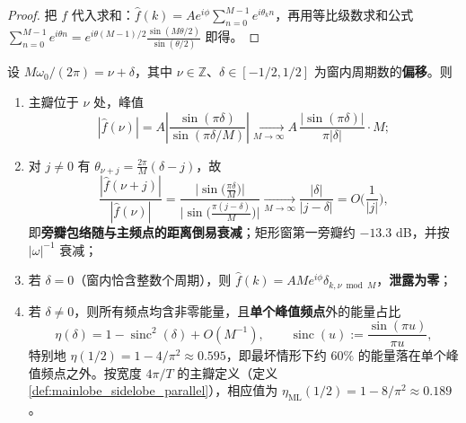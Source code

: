\begin{proof}
把 $f$ 代入求和：$\hat f(k)=Ae^{i\phi}\sum_{n=0}^{M-1}e^{i\theta_k n}$，再用等比级数求和公式 $\sum_{n=0}^{M-1}e^{i\theta n}=e^{i\theta(M-1)/2}\frac{\sin(M\theta/2)}{\sin(\theta/2)}$ 即得。
\end{proof}

\begin{theorem}[泄露包络与旁瓣]\label{thm:leakage_envelope_parallel}
设 $M\omega_0/(2\pi)=\nu+\delta$，其中 $\nu\in\mathbb{Z}$、$\delta\in[-1/2,1/2]$ 为窗内周期数的\textbf{偏移}。则
\begin{enumerate}[label=(\roman*)]
    \item 主瓣位于 $\nu$ 处，峰值
    \[
    |\hat f(\nu)|=A\left|\frac{\sin(\pi\delta)}{\sin(\pi\delta/M)}\right|\xrightarrow[M\to\infty]{}A\,\frac{|\sin(\pi\delta)|}{\pi|\delta|}\cdot M;
    \]
    \item 对 $j\ne0$ 有 $\theta_{\nu+j}=\frac{2\pi}{M}(\delta-j)$，故
    \[
    \frac{|\hat f(\nu+j)|}{|\hat f(\nu)|}
    =\frac{\big|\sin\big(\tfrac{\pi\delta}{M}\big)\big|}{\big|\sin\big(\tfrac{\pi(j-\delta)}{M}\big)\big|}
    \xrightarrow[M\to\infty]{}\frac{|\delta|}{|j-\delta|}=O\!\Big(\frac{1}{|j|}\Big),
    \]
    即\textbf{旁瓣包络随与主频点的距离倒易衰减}；矩形窗第一旁瓣约 $-13.3$ dB，并按 $|\omega|^{-1}$ 衰减；
    \item 若 $\delta=0$（窗内恰含整数个周期），则 $\hat f(k)=A M e^{i\phi}\delta_{k,\nu\bmod M}$，\textbf{泄露为零}；
    \item 若 $\delta\ne0$，则所有频点均含非零能量，且\textbf{单个峰值频点}外的能量占比
    \[
    \eta(\delta)=1-\operatorname{sinc}^2(\delta)+O(M^{-1}),
    \qquad \operatorname{sinc}(u):=\frac{\sin(\pi u)}{\pi u},
    \]
    特别地 $\eta(1/2)=1-4/\pi^2\approx0.595$，即最坏情形下约 $60\%$ 的能量落在单个峰值频点之外。按宽度 $4\pi/T$ 的主瓣定义（定义 \ref{def:mainlobe_sidelobe_parallel}），相应值为 $\eta_{\text{ML}}(1/2)=1-8/\pi^2\approx0.189$。
\end{enumerate}
\end{theorem}

